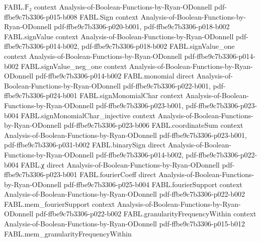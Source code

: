 \begin{theorem}
\label{FABL.parityFunction_univ_isBalanced}
\leanok
{}
\proofstep
  {FABL.𝔽₂}
  {context}
  {Analysis-of-Boolean-Functions-by-Ryan-ODonnell}
  {pdf-ffbe9c7b3306-p015-b008}
\proofstep
  {FABL.Sign}
  {context}
  {Analysis-of-Boolean-Functions-by-Ryan-ODonnell}
  {pdf-ffbe9c7b3306-p020-b001,
    pdf-ffbe9c7b3306-p018-b002}
\proofstep
  {FABL.signValue}
  {context}
  {Analysis-of-Boolean-Functions-by-Ryan-ODonnell}
  {pdf-ffbe9c7b3306-p014-b002,
    pdf-ffbe9c7b3306-p018-b002}
\proofstep
  {FABL.signValue_one}
  {context}
  {Analysis-of-Boolean-Functions-by-Ryan-ODonnell}
  {pdf-ffbe9c7b3306-p014-b002}
\proofstep
  {FABL.signValue_neg_one}
  {context}
  {Analysis-of-Boolean-Functions-by-Ryan-ODonnell}
  {pdf-ffbe9c7b3306-p014-b002}
\proofstep
  {FABL.monomial}
  {direct}
  {Analysis-of-Boolean-Functions-by-Ryan-ODonnell}
  {pdf-ffbe9c7b3306-p022-b001,
    pdf-ffbe9c7b3306-p024-b001}
\proofstep
  {FABL.signMonomialChar}
  {context}
  {Analysis-of-Boolean-Functions-by-Ryan-ODonnell}
  {pdf-ffbe9c7b3306-p023-b001,
    pdf-ffbe9c7b3306-p023-b004}
\proofstep
  {FABL.signMonomialChar_injective}
  {context}
  {Analysis-of-Boolean-Functions-by-Ryan-ODonnell}
  {pdf-ffbe9c7b3306-p023-b006}
\proofstep
  {FABL.coordinateSum}
  {context}
  {Analysis-of-Boolean-Functions-by-Ryan-ODonnell}
  {pdf-ffbe9c7b3306-p023-b001,
    pdf-ffbe9c7b3306-p031-b002}
\proofstep
  {FABL.binarySign}
  {direct}
  {Analysis-of-Boolean-Functions-by-Ryan-ODonnell}
  {pdf-ffbe9c7b3306-p014-b002,
    pdf-ffbe9c7b3306-p022-b004}
\proofstep
  {FABL.χ}
  {direct}
  {Analysis-of-Boolean-Functions-by-Ryan-ODonnell}
  {pdf-ffbe9c7b3306-p023-b001}
\proofstep
  {FABL.fourierCoeff}
  {direct}
  {Analysis-of-Boolean-Functions-by-Ryan-ODonnell}
  {pdf-ffbe9c7b3306-p025-b004}
\proofstep
  {FABL.fourierSupport}
  {context}
  {Analysis-of-Boolean-Functions-by-Ryan-ODonnell}
  {pdf-ffbe9c7b3306-p022-b002}
\proofstep
  {FABL.mem_fourierSupport}
  {context}
  {Analysis-of-Boolean-Functions-by-Ryan-ODonnell}
  {pdf-ffbe9c7b3306-p022-b002}
\proofstep
  {FABL.granularityFrequencyWithin}
  {context}
  {Analysis-of-Boolean-Functions-by-Ryan-ODonnell}
  {pdf-ffbe9c7b3306-p015-b012}
\proofstep
  {FABL.mem_granularityFrequencyWithin}

\end{theorem}

